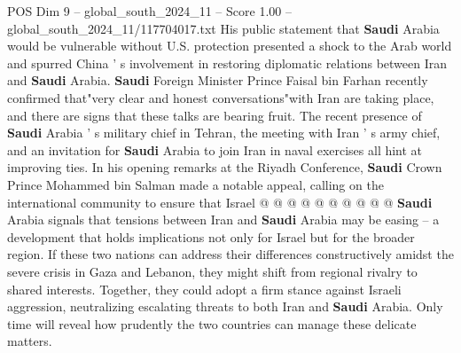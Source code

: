 \begin{textsample}{POS Dim 9 – global\_south\_2024\_11 – Score 1.00 – global\_south\_2024\_11/117704017.txt}
His public statement that \textbf{Saudi} Arabia would be vulnerable without U.S. protection presented a shock to the Arab world and spurred China ' s involvement in restoring diplomatic relations between Iran and \textbf{Saudi} Arabia. \textbf{Saudi} Foreign Minister Prince Faisal bin Farhan recently confirmed that"very clear and honest conversations"with Iran are taking place, and there are signs that these talks are bearing fruit.
The recent presence of \textbf{Saudi} Arabia ' s military chief in Tehran, the meeting with Iran ' s army chief, and an invitation for \textbf{Saudi} Arabia to join Iran in naval exercises all hint at improving ties.
In his opening remarks at the Riyadh Conference, \textbf{Saudi} Crown Prince Mohammed bin Salman made a notable appeal, calling on the international community to ensure that Israel @ @ @ @ @ @ @ @ @ @ \textbf{Saudi} Arabia signals that tensions between Iran and \textbf{Saudi} Arabia may be easing -- a development that holds implications not only for Israel but for the broader region.
If these two nations can address their differences constructively amidst the severe crisis in Gaza and Lebanon, they might shift from regional rivalry to shared interests.
Together, they could adopt a firm stance against Israeli aggression, neutralizing escalating threats to both Iran and \textbf{Saudi} Arabia.
Only time will reveal how prudently the two countries can manage these delicate matters.

\end{textsample}
